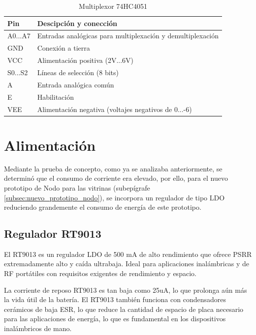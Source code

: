 \begin{table}[H]
    \centering
    \caption{Multiplexor 74HC4051}
    \label{tab:pines_74HC4051}
    \begin{tabular}{|l|l|}
    \hline
    \rowcolor[HTML]{9698ED} 
    Pin     & Descipción y conección                                            \\ \hline
    A0...A7 & Entradas analógicas para multiplexación y demultiplexación        \\ \hline
    GND     & Conexión a tierra                                                 \\ \hline
    VCC     & Alimentación positiva (2V...6V)                                   \\ \hline
    S0...S2 & Líneas de selección (8 bits)                                      \\ \hline
    A       & Entrada analógica común                                           \\ \hline
    E       & Habilitación                                                      \\ \hline
    VEE     & Alimentación negativa (voltajes negativos de 0...-6)              \\ \hline
    \end{tabular}
\end{table}



\section{Alimentación}

Mediante la prueba de concepto, como ya se analizaba anteriormente, se determinó que el consumo de corriente era elevado, por ello, para el nuevo prototipo de Nodo para las vitrinas (subepígrafe \ref{subsec:nuevo_prototipo_nodo}), se 
incorpora un regulador de tipo LDO reduciendo grandemente el consumo de energía de este prototipo.

\subsection{Regulador RT9013}

El RT9013 es un regulador LDO de 500 mA de alto rendimiento que ofrece PSRR extremadamente alto y caída ultrabaja. Ideal para aplicaciones inalámbricas y de RF portátiles con requisitos exigentes de rendimiento y espacio.

La corriente de reposo RT9013 es tan baja como 25uA, lo que prolonga aún más la vida útil de la batería. El RT9013 también funciona con condensadores cerámicos de baja ESR, lo que reduce la cantidad de espacio de placa necesario para las aplicaciones de energía, lo que es fundamental en los dispositivos inalámbricos de mano.

